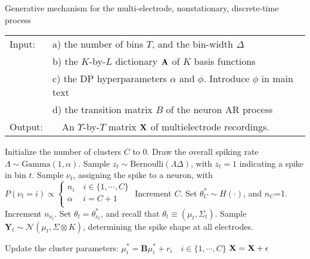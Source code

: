 \newcommand{\tx}{\tilde{x}}
\newcommand{\bY}{\mathbf{Y}}

\begin{algorithm}
\caption{Generative mechanism for the multi-electrode, nonstationary, discrete-time process}\label{alg:gen_proc}
\begin{tabular}{p{1.2cm}p{12.4cm}}
Input:&  a) the number of bins $T$, and the bin-width $\Delta$\\
  &  b) the $K$-by-$L$ dictionary $\mathbf{A}$ of $K$ basis functions\\
  &  c) the DP hyperparameters $\alpha$ and $\phi$. {\color{red} Introduce $\phi$ in main text}\\ 
  &  d) the transition matrix $B$ of the neuron AR process \\
Output:& \ \ An $\Upsilon$-by-$T$ matrix $\mathbf{X}$ of multielectrode recordings. %
\end{tabular}
\begin{algorithmic}[1]
\State Initialize the number of clusters $C$ to $0$.
\State Draw the overall spiking rate $\Lambda \sim \text{Gamma}(1,\alpha)$.
\State Sample $z_t \sim \text{Bernoulli}(\Lambda \Delta)$, with $z_t = 1$ indicating a spike in bin $t$.
   \label{enum:thin}
  \State Sample $\nu_t$, assigning the spike to a neuron, with
$  P({\nu_t} = i) \propto 
  \begin{cases}
   n_i \quad i \in \{1,\cdots, C\} \\
   \alpha \quad\ i = C + 1 \\
  \end{cases}$
          \State Increment $C$. Set $\theta^*_{C} \sim H(\cdot)$, and $n_C$=1.
       \Else \State Increment $n_{\nu_t}$.
    \EndIf
\State Set $\theta_t = \theta^*_{\nu_t}$, and recall that $\theta_t \equiv (\mu_t, \Sigma_t)$.
\State Sample $\bY_t %
           \sim \mathcal{N}(\mu_t, \Sigma \otimes K)$, determining the spike shape at all electrodes.
\EndIf

\State Update the cluster parameters: ${\mu}^*_i = \mathbf{B} {\mu}^*_i + r_i \quad i \in \{1, \cdots, C\}$
\EndFor
\State $\mathbf{X} = \mathbf{X} + \mathbf{\epsilon}$
\end{algorithmic}
\end{algorithm}


